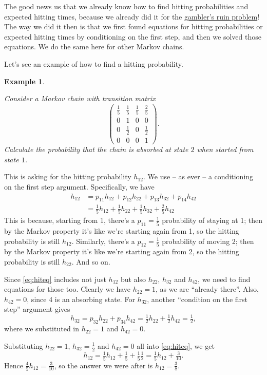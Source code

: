 \documentclass[
  a4paper,
]{article}
\theoremstyle{definition}
\theoremstyle{definition}
\newtheorem{example}{Example}[section]
\theoremstyle{definition}
\theoremstyle{remark}
\begin{document}
The good news us that we already know how to find hitting probabilities and expected hitting times, because we already did it for the \protect\hyperlink{S03-gamblers-ruin}{gambler's ruin problem}! The way we did it then is that we first found equations for hitting probabilities or expected hitting times by conditioning on the first step, and then we solved those equations. We do the same here for other Markov chains.

Let's see an example of how to find a hitting probability.

\begin{example}
\protect\hypertarget{exm:hitting1}{}\label{exm:hitting1}

\emph{Consider a Markov chain with transition matrix}
\[ \begin{pmatrix}
\frac15 & \frac15 & \frac15 & \frac25 \\
0 & 1 & 0 & 0 \\
0 & \frac12 & 0 & \frac12 \\
0 & 0 & 0 & 1
\end{pmatrix} . \]
\emph{Calculate the probability that the chain is absorbed at state \(2\) when started from state \(1\).}

This is asking for the hitting probability \(h_{12}\). We use -- as ever -- a conditioning on the first step argument. Specifically, we have
\begin{align}
  h_{12} &= p_{11} h_{12} + p_{12} h_{22} + p_{13} h_{32} + p_{14} h_{42}  \\
         &= \tfrac 15 h_{12} + \tfrac 15 h_{22} + \tfrac 15 h_{32} + \tfrac 25 h_{42}  \label{eq:hiteq}
\end{align}
This is because, starting from 1, there's a \(p_{11} = \frac15\) probability of staying at 1; then by the Markov property it's like we're starting again from 1, so the hitting probability is still \(h_{12}\). Similarly, there's a \(p_{12} = \frac15\) probability of moving 2; then by the Markov property it's like we're starting again from 2, so the hitting probability is still \(h_{22}\). And so on.

Since \eqref{eq:hiteq} includes not just \(h_{12}\) but also \(h_{22}\), \(h_{32}\) and \(h_{42}\), we need to find equations for those too. Clearly we have \(h_{22} = 1\), as we are ``already there''. Also, \(h_{42} = 0\), since 4 is an absorbing state. For \(h_{32}\), another ``condition on the first step'' argument gives
\[ h_{32} = p_{32}h_{22} + p_{34}h_{42} = \tfrac12 h_{22} + \tfrac12 h_{42} = \tfrac12 ,\]
where we substituted in \(h_{22} = 1\) and \(h_{42} = 0\).

Substituting \(h_{22} = 1\), \(h_{32} = \frac12\) and \(h_{42} = 0\) all into \eqref{eq:hiteq}, we get
\[ h_{12} = \tfrac15 h_{12} + \tfrac15 + \tfrac15 \tfrac12 = \tfrac15 h_{12} + \tfrac{3}{10}. \]
Hence \(\frac45 h_{12} = \frac{3}{10}\), so the answer we were after is \(h_{12} = \frac38\).

\end{example}
\end{document}
